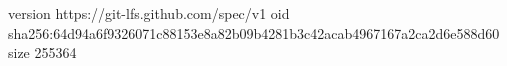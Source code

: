 version https://git-lfs.github.com/spec/v1
oid sha256:64d94a6f9326071c88153e8a82b09b4281b3c42acab4967167a2ca2d6e588d60
size 255364
